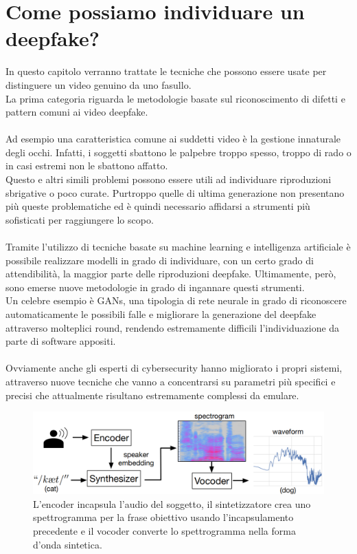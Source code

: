 \documentclass[12pt, a4paper]{article}
\begin{document}
\section{Come possiamo individuare un deepfake?}
In questo capitolo verranno trattate le tecniche che possono essere usate per distinguere un video genuino da uno fasullo.\\ La prima categoria riguarda le metodologie basate sul riconoscimento di difetti e pattern comuni ai video deepfake.\\\\
Ad esempio una caratteristica comune ai suddetti video è la gestione innaturale degli occhi. Infatti, i soggetti sbattono le palpebre troppo spesso, troppo di rado o in casi estremi non le sbattono affatto.\\
Questo e altri simili problemi possono essere utili ad individuare riproduzioni sbrigative o poco curate. Purtroppo quelle di ultima generazione non presentano più queste problematiche ed è quindi necessario affidarsi a strumenti più sofisticati per raggiungere lo scopo.\\\\
Tramite l'utilizzo di tecniche basate su machine learning e intelligenza artificiale è possibile realizzare modelli in grado di individuare, con un certo grado di attendibilità, la maggior parte delle riproduzioni deepfake. Ultimamente, però, sono emerse nuove metodologie in grado di ingannare questi strumenti.\\
Un celebre esempio è GANs, una tipologia di rete neurale in grado di riconoscere automaticamente le possibili falle e migliorare la generazione del deepfake attraverso molteplici round, rendendo estremamente difficili l'individuazione da parte di software appositi.\\\\
Ovviamente anche gli esperti di cybersecurity hanno migliorato i propri sistemi, attraverso nuove tecniche che vanno a concentrarsi su parametri più specifici e precisi che attualmente risultano estremamente complessi da emulare.\\
\begin{figure}
\includegraphics[width=1\linewidth]{img/waveform.png}
\caption{L'encoder incapsula l'audio del soggetto, il sintetizzatore crea uno spettrogramma per la frase obiettivo usando l'incapsulamento precedente e il vocoder converte lo spettrogramma nella forma d'onda sintetica.}
\label{fig2:wrapfig}
\end{figure}
\end{document}
